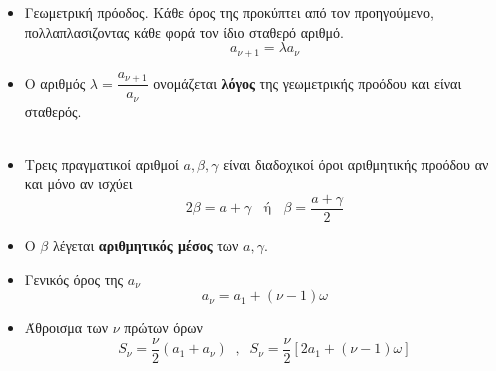 \documentclass[11pt]{article}
\begin{document}
\begin{minipage}{7cm}
\begin{itemize}[label={\footnotesize \faPlay}]
\item Γεωμετρική πρόοδος.
Κάθε όρος της προκύπτει από τον προηγούμενο, πολλαπλασιζοντας κάθε φορά τον ίδιο σταθερό αριθμό.
\[ a_{\nu+1}=\lambda a_\nu \]
\item Ο αριθμός $ \lambda=\dfrac{a_{\nu+1}}{a_\nu} $ ονομάζεται \textbf{λόγος} της γεωμετρικής προόδου και είναι σταθερός.\\\\
\item Τρεις πραγματικοί αριθμοί $ a,\beta,\gamma $ είναι διαδοχικοί όροι αριθμητικής προόδου αν και μόνο αν ισχύει \[ 2\beta=a+\gamma\;\;\textrm{ ή }\;\;\beta=\frac{a+\gamma}{2} \]
\item Ο $\beta$ λέγεται \textbf{αριθμητικός μέσος} των $a,\gamma$.
\item Γενικός όρος της $ a_\nu $
\[ a_\nu=a_1+(\nu-1)\omega \]

\item Άθροισμα των $ \nu $ πρώτων όρων
\[ S_\nu=\frac{\nu}{2}(a_1+a_\nu)\;\;,\;\;S_\nu=\frac{\nu}{2}\left[2a_1+(\nu-1)\omega\right]  \]
\end{itemize}
\end{minipage}
\end{document}
